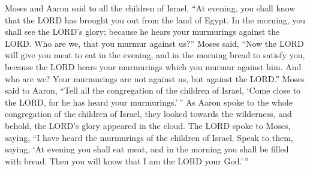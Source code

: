  Moses and Aaron said to all the children of Israel, ``At
evening, you shall know that the LORD has brought you out from the land
of Egypt.  In the morning, you shall see the LORD's glory;
because he hears your murmurings against the LORD. Who are we, that you
murmur against us?''  Moses said, ``Now the LORD will give
you meat to eat in the evening, and in the morning bread to satisfy you,
because the LORD hears your murmurings which you murmur against him. And
who are we? Your murmurings are not against us, but against the LORD.''
 Moses said to Aaron, ``Tell all the congregation of the
children of Israel, `Come close to the LORD, for he has heard your
murmurings.'\,''  As Aaron spoke to the whole congregation
of the children of Israel, they looked towards the wilderness, and
behold, the LORD's glory appeared in the cloud.  The LORD
spoke to Moses, saying,  ``I have heard the murmurings of
the children of Israel. Speak to them, saying, `At evening you shall eat
meat, and in the morning you shall be filled with bread. Then you will
know that I am the LORD your God.'\,''

